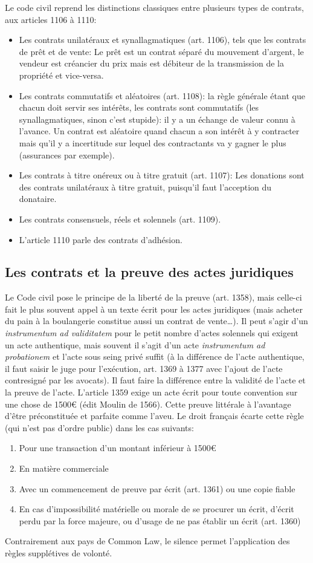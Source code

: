 \documentclass[math]{cours}
\begin{document}
Le code civil reprend les distinctions classiques entre plusieurs types de contrats, aux articles 1106 à 1110:
\begin{itemize}
	\item Les contrats unilatéraux et synallagmatiques (art. 1106), tels que les contrats de prêt et de vente: Le prêt est un contrat séparé du mouvement d'argent, le vendeur est créancier du prix mais est débiteur de la transmission de la propriété et vice-versa.
	\item Les contrats commutatifs et aléatoires (art. 1108): la règle générale étant que chacun doit servir ses intérêts, les contrats sont commutatifs (les synallagmatiques, sinon c'est stupide): il y a un échange de valeur connu à l'avance. Un contrat est aléatoire quand chacun a son intérêt à y contracter mais qu'il y a incertitude sur lequel des contractants va y gagner le plus (assurances par exemple).
	\item Les contrats à titre onéreux ou à titre gratuit (art. 1107): Les donations sont des contrats unilatéraux à titre gratuit, puisqu'il faut l'acception du donataire.
	\item Les contrats consensuels, réels et solennels (art. 1109).
	\item L'article 1110 parle des contrats d'adhésion.
\end{itemize}

\subsection{Les contrats et la preuve des actes juridiques}
Le Code civil pose le principe de la liberté de la preuve (art. 1358), mais celle-ci fait le plus souvent appel à un texte écrit pour les actes juridiques (mais acheter du pain à la boulangerie constitue aussi un contrat de vente\ldots).
Il peut s'agir d'un \emph{instrumentum ad validitatem} pour le petit nombre d'actes solennels qui exigent un acte authentique, mais souvent il s'agit d'un acte \emph{instrumentum ad probationem} et l'acte sous seing privé suffit (à la différence de l'acte authentique, il faut saisir le juge pour l'exécution, art. 1369 à 1377 avec l'ajout de l'acte contresigné par les avocats).
Il faut faire la différence entre la validité de l'acte et la preuve de l'acte.
L'article 1359 exige un acte écrit pour toute convention sur une chose de 1500€ (édit Moulin de 1566). Cette preuve littérale à l'avantage d'être préconstituée et parfaite comme l'aveu.
Le droit français écarte cette règle (qui n'est pas d'ordre public) dans les cas suivants:
\begin{enumerate}
	\item Pour une transaction d'un montant inférieur à 1500€
	\item En matière commerciale
	\item Avec un commencement de preuve par écrit (art. 1361) ou une copie fiable
	\item En cas d'impossibilité matérielle ou morale de se procurer un écrit, d'écrit perdu par la force majeure, ou d'usage de ne pas établir un écrit (art. 1360)
\end{enumerate}
Contrairement aux pays de Common Law, le silence permet l'application des règles supplétives de volonté.
\end{document}
